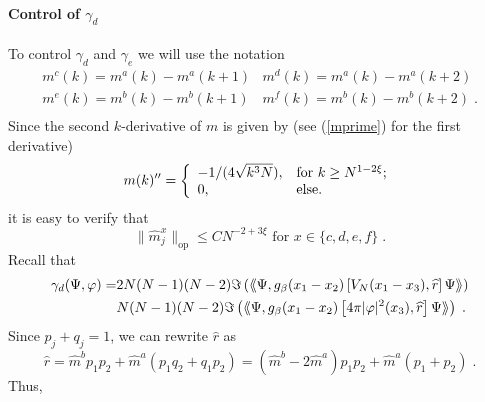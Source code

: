 \documentclass[11pt, english, american]{article}
\newcommand{\laa}{\langle\hspace{-0.08cm}\langle}
\newcommand{\raa}{\rangle\hspace{-0.08cm}\rangle}
\renewcommand{\phi}{\varphi}
\newcommand{\cs}{\gamma_d}
\newcommand{\ds}{\gamma_e}
\begin{document}
\paragraph{Control of $\cs$}


To control $\cs$ and $\ds$ we will use the notation
\begin{equation}\label{notation} \begin{array}{cc}
     m^c(k)=m^a(k)-m^a(k+1) & m^d(k)=m^a(k)-m^a(k+2) \\
    m^e(k)=m^b(k)-m^b(k+1) & m^f(k)=m^b(k)-m^b(k+2) \;. \\
  \end{array}
\end{equation}
Since the second $k$-derivative of $m$ is given by (see (\ref{mprime}) for the first derivative)
$$m(k)^{\prime\prime}=\left\{
         \begin{array}{ll}
           -1/(4\sqrt{k^3N}), & \hbox{for $k\geq N^{1-2\xi}$;} \\
          0, & \hbox{else.}
         \end{array}
       \right.$$
it is easy to verify that
\begin{equation}\label{estcdef}\|\widehat{m}_j^x\|_{\text{op}} \leq C N^{-2+3\xi} \text{ for }x\in\{c,d,e,f\}\;.\end{equation}
Recall that \begin{align*}\cs (\Psi,\phi)=&2N(N-1)(N-2)\Im\left(\laa\Psi ,g_{\beta}(x_{1}-x_{2})
\left[V_N(x_1-x_3),
\widehat{r}\right] \Psi\raa\right)
%
\\&N(N-1)(N-2)\Im\left(\laa\Psi ,g_{\beta}(x_{1}-x_{2})
\left[4 \pi|\phi|^2(x_3),
\widehat{r}\right] \Psi\raa\right)\;.\end{align*}
Since $p_j+q_j=1$, we can rewrite $\widehat{r}$ as
 $$
 \widehat{r}=\widehat{m}^bp_{1}p_{2}+\widehat{m}^a(p_{1}q_{2}+q_1p_2)=(\widehat{m}^b-2\widehat{m}^a)p_{1}p_{2}+\widehat{m}^a(p_{1}+p_2)\;.$$
Thus,
\end{document}
